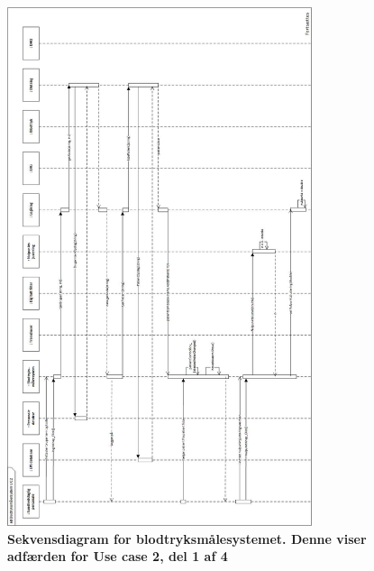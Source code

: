 \begin{figure}[H]
\includegraphics[width =0.8\textwidth , center]{billeder/sdUC2}
\caption{\textbf{Sekvensdiagram for blodtryksmålesystemet. Denne viser adfærden for Use case 2, del 1 af 4}}
\end{figure}
